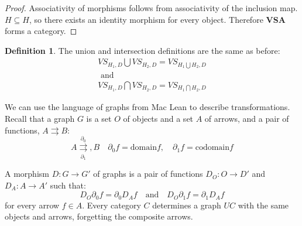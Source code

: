 \documentclass{article}
\theoremstyle{definition}
\newtheorem{definition}{Definition}[section]
\begin{document}
\begin{proof}
Associativity of morphisms follows from associativity of the inclusion map. $H \subseteq H$, so there exists an identity morphism for every object. Therefore \textbf{VSA} forms a category.
\end{proof}

\begin{definition}
The union and intersection definitions are the same as before: 
\begin{gather*}
    VS_{H_1, D} \bigcup VS_{H_2, D} = VS_{H_1\bigcup H_2, D}  \\ \text{ and } \\
     VS_{H_1, D} \bigcap VS_{H_2, D} = VS_{H_1\bigcap H_2, D}  
\end{gather*}
\end{definition}

We can use the language of graphs from Mac Lean\cite{maclean} to describe transformations. Recall that a graph $G$ is a set $O$ of objects and a set $A$ of arrows, and a pair of functions, $A\rightrightarrows B$:
\begin{equation}
    A \overset{\partial_0}{\underset{\partial_1}{\rightrightarrows}}, B \quad
    \partial_0 f = \text{domain} f, \quad
    \partial_1 f = \text{codomain} f
\end{equation}

A morphism $D:G\rightarrow G'$ of graphs is a pair of functions $D_O : O \rightarrow D'$ and $D_A: A\rightarrow A' $ such that: 
\begin{equation}
    D_O \partial_0 f = \partial_0 D_A f \quad \textrm{and} \quad D_O \partial_1f = \partial_1 D_A f
\end{equation}
for every arrow $f \in A$. Every category $C$ determines a graph $ UC $ with the same objects and arrows, forgetting the composite arrows. 
\end{document}
